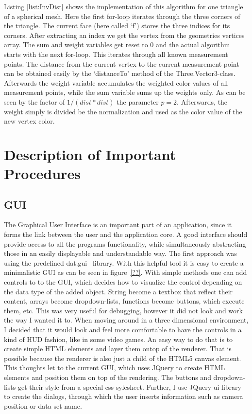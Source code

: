 Listing \ref{list:InvDist} shows the implementation of this algorithm for one triangle of a spherical mesh. Here the first for-loop iterates through the three corners of the triangle. The current face (here called `f') stores the three indices for its corners. After extracting an index we get the vertex from the geometries vertices array. The sum and weight variables get reset to 0 and the actual algorithm starts with the next for-loop. This iterates through all known measurement points. The distance from the current vertex to the current measurement point can be obtained easily by the `distanceTo' method of the Three.Vector3-class. Afterwards the weight variable accumulates the weighted color values of all measurement points, while the sum variable sums up the weights only. As can be seen by the factor of $1/(dist*dist)$ the parameter $p = 2$. Afterwards, the weight simply is divided be the normalization and used as the color value of the new vertex color.
\section{Description of Important Procedures}
\subsection{GUI}
The Graphical User Interface is an important part of an application, since it forms the link between the user and the application core. A good interface should provide access to all the programs functionality, while simultaneously abstracting those in an easily displayable and understandable way. The first approach was using the predefined dat.gui~\cite{datgui} library. With this helpful tool it is easy to create a minimalistic GUI as can be seen in figure~\ref{??}. With simple methods one can add controls to to the GUI, which decides how to visualize the control depending on the data type of the added object. String become a textbox that reflect their content, arrays become dropdown-lists, functions become buttons, which execute them, etc. This was very useful for debugging, however it did not look and work the way I wanted it to. When moving around in a three dimensional environment, I decided that it would look and feel more comfortable to have the controls in a kind of HUD fashion, like in some video games. An easy way to do that is to create simple HTML elements and layer them ontop of the renderer. That is possible because the renderer is also just a child of the HTML5 canvas element. This thoughts let to the current GUI, which uses JQuery to create HTML elements and position them on top of the rendering. The buttons and dropdown-lists get their style from a special css-sylesheet. Further, I use JQuery-ui library to create the dialogs, through which the user inserts information such as camera position or data set name.

